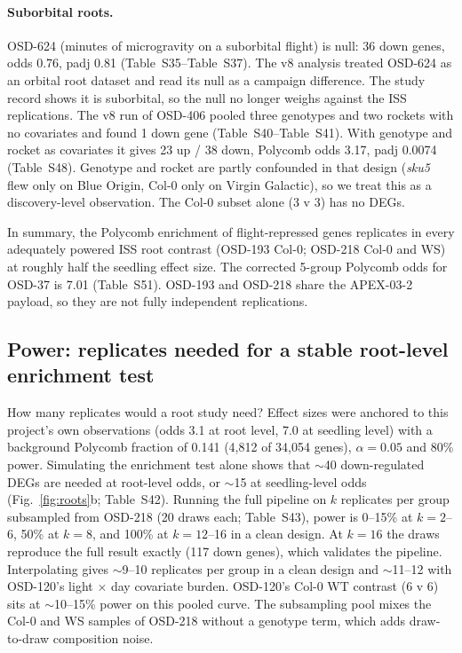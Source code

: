 \documentclass[11pt,a4paper]{article}
\newcommand{\Sx}[1]{Table~S#1}
\begin{document}
\paragraph{Suborbital roots.} OSD-624 (minutes of microgravity on a suborbital flight) is null: 36 down genes,
odds 0.76, padj 0.81 (\Sx{35}--\Sx{37}). The v8 analysis treated OSD-624 as an orbital root dataset and read
its null as a campaign difference. The study record shows it is suborbital, so the null no longer weighs against
the ISS replications. The v8 run of OSD-406 pooled three genotypes and two rockets with no covariates and found
1 down gene (\Sx{40}--\Sx{41}). With genotype and rocket as covariates it gives 23 up / 38 down, Polycomb odds
3.17, padj 0.0074 (\Sx{48}). Genotype and rocket are partly confounded in that design (\textit{sku5} flew only on
Blue Origin, Col-0 only on Virgin Galactic), so we treat this as a discovery-level observation. The Col-0 subset
alone (3 v 3) has no DEGs.

In summary, the Polycomb enrichment of flight-repressed genes replicates in every adequately powered ISS root
contrast (OSD-193 Col-0; OSD-218 Col-0 and WS) at roughly half the seedling effect size. The corrected 5-group
Polycomb odds for OSD-37 is 7.01 (\Sx{51}). OSD-193 and OSD-218 share the APEX-03-2 payload, so they are not fully
independent replications.

\subsection{Power: replicates needed for a stable root-level enrichment test}

How many replicates would a root study need? Effect sizes were anchored to this project's
own observations (odds 3.1 at root level, 7.0 at seedling level) with a background Polycomb fraction
of 0.141 (4,812 of 34,054 genes), $\alpha=0.05$ and 80\% power. Simulating the enrichment test alone shows
that $\sim$40 down-regulated DEGs are needed at root-level odds, or $\sim$15 at seedling-level
odds (Fig.~\ref{fig:roots}b; \Sx{42}). Running the full pipeline on $k$ replicates per group
subsampled from OSD-218 (20 draws each; \Sx{43}), power is 0--15\% at $k=2$--6, 50\% at $k=8$, and 100\% at
$k=12$--16 in a clean design. At $k=16$ the draws reproduce the full result exactly (117 down genes),
which validates the pipeline. Interpolating gives $\sim$9--10 replicates per group in a clean design and
$\sim$11--12 with OSD-120's light $\times$ day covariate burden. OSD-120's Col-0 WT contrast
(6 v 6) sits at $\sim$10--15\% power on this pooled curve. The subsampling pool mixes the Col-0 and WS samples of OSD-218 without a
genotype term, which adds draw-to-draw composition noise.
\end{document}

